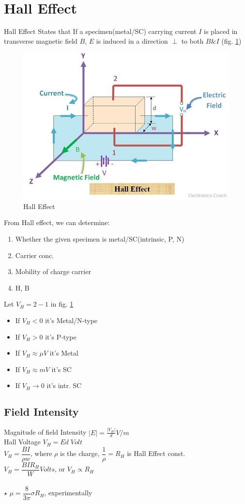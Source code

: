 \documentclass[10pt, a4paper]{report}
\begin{document}
	\section{Hall Effect}
	Hall Effect States that If a specimen(metal/SC) carrying current $ I $ is placed in transverse magnetic field $ B $, $ E $ is induced in a direction $ \perp $ to both $ B \& I $ (fig. \ref{fig:hall-effect})
	\begin{figure}[h]
		\centering
		\includegraphics[width=0.7\linewidth]{img/hall-effect}
		\caption{Hall Effect}
		\label{fig:hall-effect}
	\end{figure}
	\par 
	From Hall effect, we can determine:
	\begin{enumerate}
		\item Whether the given specimen is metal/SC(intrinsic, P, N)
		\item Carrier conc.
		\item Mobility of charge carrier
		\item H, B
	\end{enumerate}
	Let $ V_H  = 2-1$ in fig. \ref{fig:hall-effect}
    \begin{itemize}
    	\item If $ V_H  <  0$ it's Metal/N-type
    	\item If $ V_H > 0$ it's P-type
    	\item If $ V_H \approx \mu V $ it's Metal
       	\item If $ V_H \approx m V $ it's SC
       	\item If $ V_H \rightarrow 0 $ it's intr. SC
    \end{itemize}
	\subsection{Field Intensity}
	Magnitude of field Intensity $ |E| = \frac{|V_H|}{d} V/m$ \\
	Hall Voltage $ V_H = Ed \; Volt $\\
	$ V_H = \dfrac{BI}{\rho w} $, where $\rho$ is the charge, $ \dfrac{1}{\rho} = R_H$ is Hall Effect const.\\
	$ V_H = \dfrac{BIR_H}{W} Volts$, or $ V_H \propto R_H $\\
	\\
	$\star$ $ \mu = \dfrac{8}{3\pi} \sigma R_H $, experimentally
\end{document}
